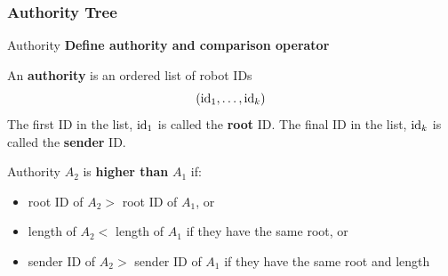 \subsubsection{Authority Tree}
\begin{frame}{Authority}
  \textbf{Define authority and comparison operator}
      \begin{definition}
      \small{An \textbf{authority} is an ordered list of robot IDs
        $$({\rm id}_1, \ldots, {\rm id}_k)$$
        The first ID in the list, ${\rm id}_1$ is called the \textbf{root} ID.
        The final ID in the list, ${\rm id}_k$ is called the \textbf{sender} ID.}
    \end{definition}
    \begin{definition}
      \small{Authority $A_2$ is \textbf{higher than} $A_1$ if:}
      \begin{itemize}
      \item \small{root ID of $A_2 >$ root ID of $A_1$, or}
      \item \small{length of $A_2 <$  length of $A_1$ if they have the same root, or}
      \item \small{sender ID of $A_2 >$ sender ID of $A_1$ if they have the same root and length}
      \end{itemize}
    \end{definition}
\end{frame}


